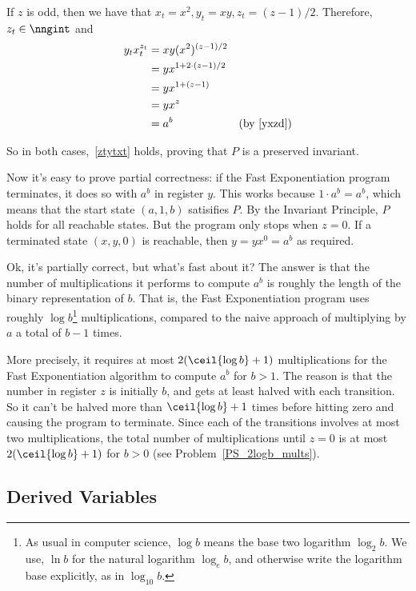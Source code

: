 If $z$ is odd, then we have that $x_t = x^2, y_t = xy, z_t = (z-1)/2$.
Therefore, $z_t \in \nngint$ and
\begin{align*}
y_tx_t^{z_t} & = xy(x^2)^{(z-1)/2}\\
& = yx^{1+2 \cdot (z-1)/2}\\
& = yx^{1+(z-1)}\\
& = yx^z\\
& = a^b & \mbox{(by~\eqref{yxzd})}
\end{align*}

So in both cases,~\eqref{ztytxt} holds, proving that $P$ is a preserved
invariant.

Now it's easy to prove partial correctness: if the Fast
Exponentiation program terminates, it does so with $a^b$ in register
$y$.  This works because $1\cdot a^b = a^b$, which means
that the start state $(a,1,b)$ satisifies $P$.  By the Invariant
Principle, $P$ holds for all reachable states.  But the program
only stops when $z = 0$.  If a terminated state $(x,y,0)$ is
reachable, then $y = yx^0 = a^b$ as required.

Ok, it's partially correct, but what's fast about it?  The answer is
that the number of multiplications it performs to compute $a^b$ is
roughly the length of the binary representation of $b$.  That is, the
Fast Exponentiation program uses roughly $\log b$\footnote{As usual in
  computer science, $\log b$ means the base two logarithm $\log_2 b$.
  We use, $\ln b$ for the natural logarithm $\log_e b$, and otherwise
  write the logarithm base explicitly, as in $\log_{10} b$.}
 multiplications,
compared to the naive approach of multiplying by $a$ a total of $b-1$
times.

More precisely, it requires at most $2 (\ceil{\log b}+1)$
multiplications for the Fast Exponentiation algorithm to compute $a^b$ for
$b>1$.  The reason is that the number in register $z$ is initially $b$,
and gets at least halved with each transition.  So it can't be halved more
than $\ceil{\log b}+1$ times before hitting zero and causing the
program to terminate.  \iffalse The $(b+1)$ comes in because for $b =
2^p$, a power of two, it takes $(p+1)$ halves to get zero.  \fi Since each
of the transitions involves at most two multiplications, the total number
of multiplications until $z=0$ is at most $2(\ceil{\log b}+1)$ for $b
> 0$ (see Problem~\ref{PS_2logb_mults}).

\subsection{Derived Variables}\label{derived_var_subsec}

